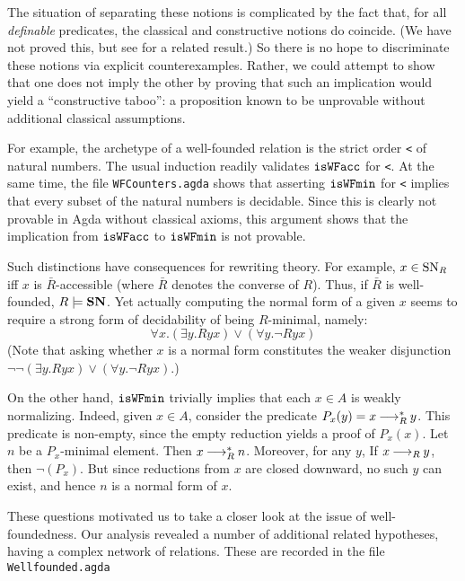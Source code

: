 The situation of separating these notions is complicated by the fact that, for all
\emph{definable} predicates, the classical and constructive notions do coincide.
(We have not proved this, but see \cite{Berardi} for a related result.)
So there is no hope to discriminate these notions via explicit counterexamples.
Rather, we could attempt to show that one does not imply the other by proving that
such an implication would yield a ``constructive taboo'': a proposition known to be
unprovable without additional classical assumptions.

For example, the archetype of a well-founded relation is the strict order \verb|<|
of natural numbers.  The usual induction readily validates $\mathtt{isWFacc}$ for \verb|<|.
  At the same time, the file \texttt{WFCounters.agda} shows that
asserting $\mathtt{isWFmin}$ for \verb|<| implies that every subset of the natural numbers is decidable.  Since this is clearly not provable in Agda without classical axioms,
this argument shows that the implication from $\mathtt{isWFacc}$ to $\mathtt{isWFmin}$ is not provable.

Such distinctions have consequences for rewriting theory.
For example, $x\in \mathrm{SN}_R$ iff $x$ is $\bar{R}$-accessible (where $\bar{R}$ denotes
the converse of $R$).  Thus, if $\bar{R}$ is well-founded, $R \models \mathbf{SN}$.
Yet actually computing the normal form of a given $x$ seems to require a
strong form of decidability of being $R$-minimal, namely:
\[
\tag{$\isMinDec$} \forall x. \left(\exists y. Ryx\right) \lor \left(\forall y. \lnot Ryx\right)
\]
(Note that asking whether $x$ is a normal form constitutes the weaker disjunction
$\lnot\lnot\left(\exists y. Ryx\right) \lor \left(\forall y. \lnot Ryx\right)$.)

On the other hand, $\mathtt{isWFmin}$ trivially implies that each $x \in A$ is weakly normalizing.
Indeed, given $x \in A$, consider the predicate $P_x(y) = x \mathbin{\longrightarrow_R^*} y$.
This predicate is non-empty, since the empty reduction yields a proof of $P_x(x)$.
Let $n$ be a $P_x$-minimal element.  Then $x \mathbin{\longrightarrow_R^*} n$.  Moreover, for any $y$,
If $x \mathbin{\longrightarrow_R} y$, then $\lnot(P_x)$.  But since reductions from $x$ are closed downward,
no such $y$ can exist, and hence $n$ is a normal form of $x$.

%
These questions motivated us to take a closer look at the issue of well-foundedness.
Our analysis revealed a number of additional related hypotheses, having a complex
network of relations.  %
These are recorded in the file \verb|Wellfounded.agda|
